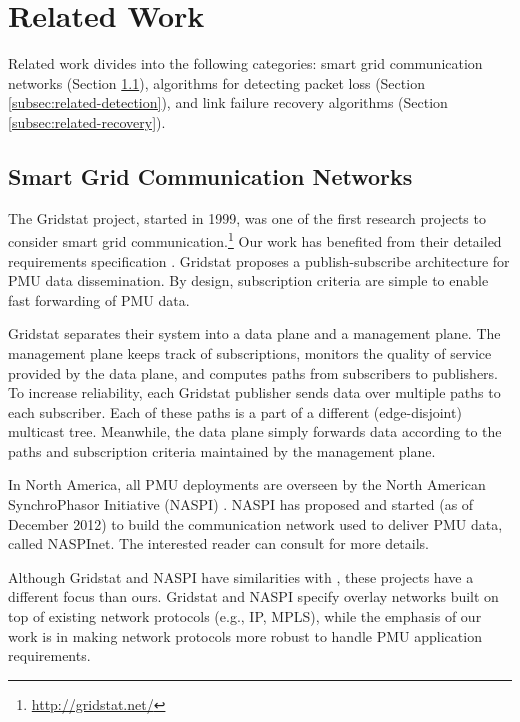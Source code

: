 
\section{Related Work}
\label{sec:related}

Related work divides into the following categories: smart grid communication networks (Section \ref{subsec:related-grid-comm}), algorithms for detecting packet loss 
(Section \ref{subsec:related-detection}), and link failure recovery algorithms (Section \ref{subsec:related-recovery}).

\subsection{Smart Grid Communication Networks}
\label{subsec:related-grid-comm}


The Gridstat project, started in 1999, was one of the first research projects to consider smart grid communication.\footnote{\url{http://gridstat.net/}}
Our work has benefited from their detailed requirements specification \cite{Bakken11}.
Gridstat proposes a publish-subscribe architecture for PMU data dissemination. By design, subscription criteria are simple to enable fast forwarding of PMU data.

Gridstat separates their system into a data plane and a management plane. The management plane keeps track of subscriptions,
monitors the quality of service provided by the data plane, and computes paths from subscribers to publishers.  To increase reliability, each Gridstat publisher sends data over multiple paths
to each subscriber. Each of these paths is a part of a different (edge-disjoint) multicast tree.  Meanwhile, the data plane simply forwards data according to the paths and subscription 
criteria maintained by the management plane.  

In North America, all PMU deployments are overseen by the North American SynchroPhasor Initiative (NASPI) \cite{Naspi10}.  NASPI has proposed and started (as of December 2012) to build the
communication network used to deliver PMU data, called NASPInet. The interested reader can consult \cite{Naspi10} for more details.

Although Gridstat \cite{Bakken11} and NASPI \cite{Naspi10} have similarities with \mdrs, these projects have a different focus than ours.  Gridstat and NASPI specify overlay networks 
built on top of existing network protocols (e.g., IP, MPLS), while the emphasis of our work is in making network protocols more robust to handle PMU application requirements. 

